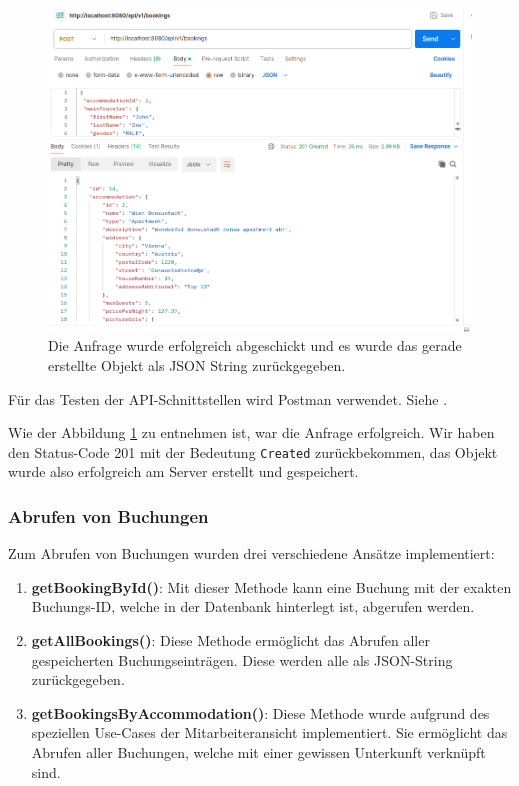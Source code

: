 	\begin{figure}
		\centering
		\includegraphics[width=1\textwidth]{images/impl-new-booking-post-req.png}
		\caption{Die Anfrage wurde erfolgreich abgeschickt und es wurde das gerade erstellte Objekt als JSON String zurückgegeben.}
        \label{req-bookings-post}
	\end{figure}
	
	Für das Testen der API-Schnittstellen wird Postman verwendet. Siehe \cite{website-postman}.
	
	Wie der Abbildung \ref{req-bookings-post} zu entnehmen ist, war die Anfrage erfolgreich. Wir haben den Status-Code 201 mit der Bedeutung \texttt{Created} zurückbekommen, das Objekt wurde also erfolgreich am Server erstellt und gespeichert.
	
	
	\subsubsection{Abrufen von Buchungen}
	
	Zum Abrufen von Buchungen wurden drei verschiedene Ansätze implementiert:
	\begin{enumerate}
		\item \textbf{getBookingById()}: Mit dieser Methode kann eine Buchung mit der exakten Buchungs-ID, welche in der Datenbank hinterlegt ist, abgerufen werden.
		\item \textbf{getAllBookings()}: Diese Methode ermöglicht das Abrufen aller gespeicherten Buchungseinträgen. Diese werden alle als JSON-String zurückgegeben.
		\item \textbf{getBookingsByAccommodation()}: Diese Methode wurde aufgrund des speziellen Use-Cases der Mitarbeiteransicht implementiert. Sie ermöglicht das Abrufen aller Buchungen, welche mit einer gewissen Unterkunft verknüpft sind. 
	\end{enumerate}
	
